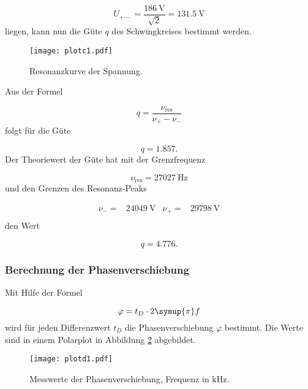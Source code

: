 \begin{equation}
  U_{+-} = \frac{\SI{186}{\V}}{\sqrt{2}} = \SI{131.5}{\V}
\end{equation}
liegen, kann nun die Güte $q$ des Schwingkreises bestimmt werden.

\newpage

\begin{figure}[h]
  \centering
  \texttt{[image: plotc1.pdf]}
  \caption{Resonanzkurve der Spannung.}
  \label{fig:plotc1}
\end{figure}

Aus der Formel

\begin{equation}
  q = \frac{\nu_\text{res}}{\nu_+ - \nu_-}
\end{equation}
folgt für die Güte

\begin{equation}
  q = 1.857 .
\end{equation}
Der Theoriewert der Güte hat mit der Grenzfrequenz

\begin{equation}
  \nu_\text{res} = \SI{27027}{\hertz}
\end{equation}
und den Grenzen des Resonanz-Peaks

\begin{align}
  \nu_- = & \SI{24049}{\V} & \nu_+ = & \SI{29798}{\V} \\
\end{align}
den Wert

\begin{equation}
  q = 4.776 .
\end{equation}

\subsubsection{Berechnung der Phasenverschiebung}

Mit Hilfe der Formel

\begin{equation}
  \varphi = t_D \cdot 2\symup{\pi}f
\end{equation}
wird für jeden Differenzwert $t_D$ die Phasenverschiebung $\varphi$ bestimmt.
Die Werte sind in einem Polarplot in Abbildung \ref{fig:Polar} abgebildet.

\begin{figure}
  \centering
  \texttt{[image: plotd1.pdf]}
  \caption{Messwerte der Phasenverschiebung, Frequenz in $\si{\kilo\hertz}$.}
  \label{fig:Polar}
\end{figure}

